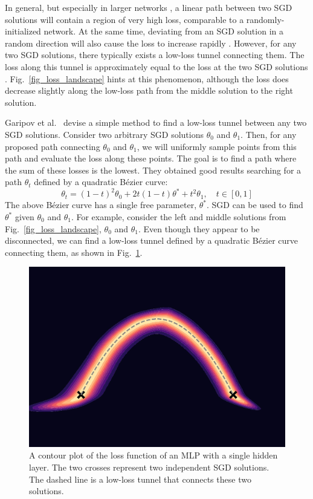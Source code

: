 \documentclass[12pt]{article}
\begin{document}
In general, but especially in larger networks \cite{mode_connectivity}, a linear path between two SGD solutions will contain a region of very high loss, comparable to a randomly-initialized network. At the same time, deviating from an SGD solution in a random direction will also cause the loss to increase rapidly \cite{swag}. However, for any two SGD solutions, there typically exists a low-loss tunnel connecting them. The loss along this tunnel is approximately equal to the loss at the two SGD solutions \cite{mode_connectivity}. Fig.\ \ref{fig_loss_landscape} hints at this phenomenon, although the loss does decrease slightly along the low-loss path from the middle solution to the right solution.

Garipov et al.\ \cite{mode_connectivity} devise a simple method to find a low-loss tunnel between any two SGD solutions. Consider two arbitrary SGD solutions $\theta_0$ and $\theta_1$. Then, for any proposed path connecting $\theta_0$ and $\theta_1$, we will uniformly sample points from this path and evaluate the loss along these points. The goal is to find a path where the sum of these losses is the lowest. They obtained good results searching for a path $\theta_t$ defined by a quadratic Bézier curve:
\begin{equation}
\theta_t = (1-t)^2 \theta_0 + 2t(1-t) \theta^* + t^2 \theta_1, \quad t \in [0, 1]
\end{equation}
The above Bézier curve has a single free parameter, $\theta^*$. SGD can be used to find $\theta^*$ given $\theta_0$ and $\theta_1$. For example, consider the left and middle solutions from Fig.\ \ref{fig_loss_landscape}, $\theta_0$ and $\theta_1$. Even though they appear to be disconnected, we can find a low-loss tunnel defined by a quadratic Bézier curve connecting them, as shown in Fig.\ \ref{fig_mode_connectivity}.

\begin{figure}[H]
\centering
\includegraphics[width=12cm]{plots/mode_connectivity.pdf}
\caption{A contour plot of the loss function of an MLP with a single hidden layer. The two crosses represent two independent SGD solutions. The dashed line is a low-loss tunnel that connects these two solutions.}
\label{fig_mode_connectivity}
\end{figure}
\end{document}
